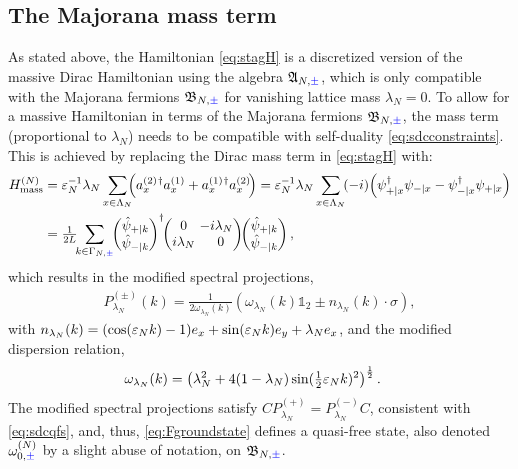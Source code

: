 \documentclass[a4paper, 11pt]{article}
\newcommand{\fA}{\mathfrak{A}}\newcommand{\cA}{\mathcal{A}}\newcommand{\dA}{\mathds{A}}\newcommand{\sA}{\mathscr{A}}
\newcommand{\fB}{\mathfrak{B}}\newcommand{\cB}{\mathcal{B}}\newcommand{\dB}{\mathds{B}}\newcommand{\sB}{\mathscr{B}}
\DeclareMathOperator{\1}{\mathds{1}}
\begin{document}
\subsection{The Majorana mass term}
\label{sec:majmass}
As stated above, the Hamiltonian \eqref{eq:stagH} is a discretized version of the massive Dirac Hamiltonian using the algebra $\fA_{N,{\color{blue}\pm}}$, which is only compatible with the Majorana fermions $\fB_{N,{\color{blue}\pm}}$ for vanishing lattice mass $\lambda_{N}=0$. To allow for a massive Hamiltonian in terms of the Majorana fermions $\fB_{N,{\color{blue}\pm}}$, the mass term (proportional to $\lambda_{N}$) needs to be compatible with self-duality \eqref{eq:sdcconstraints}. This is achieved by replacing the Dirac mass term in \eqref{eq:stagH} with:
\begin{align}
\label{eq:majmass}
H^{(N)}_{\textup{mass}} & = \vep_{N}^{-1}\lambda_{N}\sum_{x\in\Lambda_{N}}\!\!\!\left(a^{(2)\!\!\ \dagger}_{x}a^{(1)}_{x} + a^{(1)\!\!\ \dagger}_{x}a^{(2)}_{x}\!\right) = \vep_{N}^{-1}\lambda_{N}\sum_{x\in\Lambda_{N}}\!(-i)\!\left(\psi^{\dagger}_{+|x}\psi_{-|x} - \psi^{\dagger}_{-|x}\psi_{+|x}\right) \\ \nonumber
 & = \tfrac{1}{2L}\!\!\sum_{k\in\Gamma_{N,{\color{blue}\pm}}}\!\!\begin{pmatrix} \hat{\psi}_{+|k} \\ \hat{\psi}_{-|k} \end{pmatrix}^{\dagger}\!\! \begin{pmatrix} 0 & \!\!\!\!-i\lambda_{N} \\ i \lambda_{N} & 0 \end{pmatrix}\!\! \begin{pmatrix} \hat{\psi}_{+|k} \\ \hat{\psi}_{-|k} \end{pmatrix},
\end{align}
which results in the modified spectral projections,
\begin{align}
\label{eq:majproj}
P^{(\pm)}_{\lambda_{N}}(k) = \tfrac{1}{2\omega_{\lambda_{N}}(k)}(\omega_{\lambda_{N}}(k)\mathds{1}_{2} \pm n_{\lambda_{N}}(k)\cdot\sigma),
\end{align}
with $n_{\lambda_{N}}(k) = (\cos(\varepsilon_{N}k)-1)e_{x} + \sin(\varepsilon_{N}k)e_{y} + \lambda_{N}e_{x}$, and the modified dispersion relation,
\begin{align}
\label{eq:majdis}
\omega_{\lambda_{N}}(k) & = \left(\lambda_{N}^{2}+4(1-\lambda_{N})\sin(\tfrac{1}{2}\varepsilon_{N}k)^{2}\right)^{\frac{1}{2}}.
\end{align}
The modified spectral projections satisfy $CP^{(+)}_{\lambda_{N}} = P^{(-)}_{\lambda_{N}}C$, consistent with \eqref{eq:sdcqfs}, and, thus, \eqref{eq:Fgroundstate} defines a quasi-free state, also denoted $\omega^{(N)}_{0,{\color{blue}\pm}}$ by a slight abuse of notation, on $\fB_{N,{\color{blue}\pm}}$.
\end{document}
